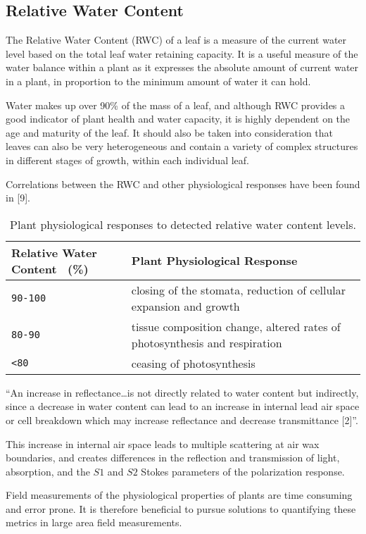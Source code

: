 \subsection{Relative Water Content}
The Relative Water Content (RWC) of a leaf is a measure of the current water level based on the total leaf water retaining capacity.  It is a useful measure of the water balance within a plant as it expresses the absolute amount of current water in a plant, in proportion to the minimum amount of water it can hold.

Water makes up over 90\% of the mass of a leaf, and although RWC provides a good indicator of plant health and water capacity, it is highly dependent on the age and maturity of the leaf.  It should also be taken into consideration that leaves can also be very heterogeneous and contain a variety of complex structures in different stages of growth, within each individual leaf.

Correlations between the RWC and other physiological responses have been found in [9].

\begin{table}[h]
  \centering
  \begin{tabular}{ll}
    \toprule
    \textbf{Relative Water Content ~(\%)}      & \textbf{Plant Physiological Response}\\
    \midrule
      \texttt{90-100}          & closing of the stomata, reduction of cellular expansion and growth\\
      \texttt{80-90}           & tissue composition change, altered rates of photosynthesis and respiration\\
      \texttt{<80}         & ceasing of photosynthesis\\
    \bottomrule
  \end{tabular}
  \caption{%
    Plant physiological responses to detected relative water content levels.
  }
  \label{tab:Packages}
\end{table}

“An increase in reflectance…is not directly related to water content but indirectly, since a decrease in water content can lead to an increase in internal lead air space or cell breakdown which may increase reflectance and decrease transmittance [2]”.

This increase in internal air space leads to multiple scattering at air wax boundaries, and creates differences in the reflection and transmission of light, absorption, and the $S1$ and $S2$ Stokes parameters of the polarization response.

Field measurements of the physiological properties of plants are time consuming and error prone.  It is therefore beneficial to pursue solutions to quantifying these metrics in large area field measurements.
